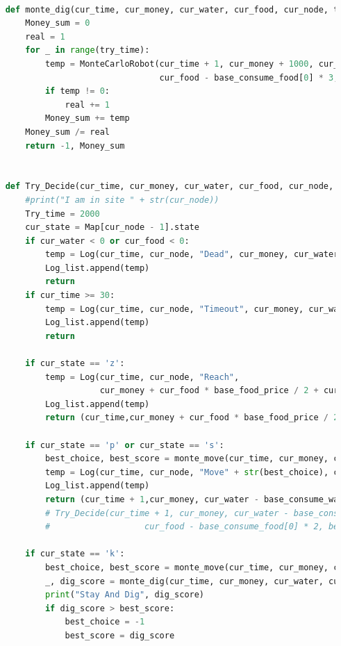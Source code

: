 \documentclass[withoutpreface,bwprint]{cumcmthesis} %
\begin{document}
\begin{appendices}
\begin{lstlisting}[language=python]
    
    def monte_dig(cur_time, cur_money, cur_water, cur_food, cur_node, try_time):
        Money_sum = 0
        real = 1
        for _ in range(try_time):
            temp = MonteCarloRobot(cur_time + 1, cur_money + 1000, cur_water - base_consume_water[0] * 3,
                                   cur_food - base_consume_food[0] * 3, cur_node)
            if temp != 0:
                real += 1
            Money_sum += temp
        Money_sum /= real
        return -1, Money_sum
    
    
    def Try_Decide(cur_time, cur_money, cur_water, cur_food, cur_node, Log_list):
        #print("I am in site " + str(cur_node))
        Try_time = 2000
        cur_state = Map[cur_node - 1].state
        if cur_water < 0 or cur_food < 0:
            temp = Log(cur_time, cur_node, "Dead", cur_money, cur_water, cur_food)
            Log_list.append(temp)
            return
        if cur_time >= 30:
            temp = Log(cur_time, cur_node, "Timeout", cur_money, cur_water, cur_food)
            Log_list.append(temp)
            return
    
        if cur_state == 'z':
            temp = Log(cur_time, cur_node, "Reach",
                       cur_money + cur_food * base_food_price / 2 + cur_water * base_water_price / 2, cur_water, cur_food)
            Log_list.append(temp)
            return (cur_time,cur_money + cur_food * base_food_price / 2 + cur_water * base_water_price / 2,0,0,cur_node)
    
        if cur_state == 'p' or cur_state == 's':
            best_choice, best_score = monte_move(cur_time, cur_money, cur_water, cur_food, cur_node, Try_time)
            temp = Log(cur_time, cur_node, "Move" + str(best_choice), cur_money, cur_water, cur_food)
            Log_list.append(temp)
            return (cur_time + 1,cur_money, cur_water - base_consume_water[0] * 2,cur_food - base_consume_food[0] * 2,best_choice)
            # Try_Decide(cur_time + 1, cur_money, cur_water - base_consume_water[0] * 2,
            #                   cur_food - base_consume_food[0] * 2, best_choice, Log_list)
    
        if cur_state == 'k':
            best_choice, best_score = monte_move(cur_time, cur_money, cur_water, cur_food, cur_node, Try_time)
            _, dig_score = monte_dig(cur_time, cur_money, cur_water, cur_food, cur_node, Try_time)
            print("Stay And Dig", dig_score)
            if dig_score > best_score:
                best_choice = -1
                best_score = dig_score
    

\end{lstlisting}
\end{appendices}
\end{document}
